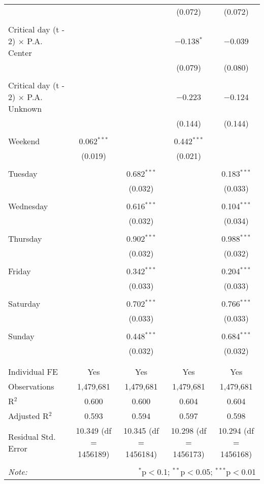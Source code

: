 \documentclass[
]{article}
\begin{document}
\begin{table}[!htbp]
{\begin{tabular}{@{\extracolsep{5pt}}lcccc}
  &  &  & (0.072) & (0.072) \\ 
  & & & & \\ 
 Critical day (t - 2) $\times$ P.A. Center &  &  & $-$0.138$^{*}$ & $-$0.039 \\ 
  &  &  & (0.079) & (0.080) \\ 
  & & & & \\ 
 Critical day (t - 2) $\times$ P.A. Unknown &  &  & $-$0.223 & $-$0.124 \\ 
  &  &  & (0.144) & (0.144) \\ 
  & & & & \\ 
 Weekend & 0.062$^{***}$ &  & 0.442$^{***}$ &  \\ 
  & (0.019) &  & (0.021) &  \\ 
  & & & & \\ 
 Tuesday &  & 0.682$^{***}$ &  & 0.183$^{***}$ \\ 
  &  & (0.032) &  & (0.033) \\ 
  & & & & \\ 
 Wednesday &  & 0.616$^{***}$ &  & 0.104$^{***}$ \\ 
  &  & (0.032) &  & (0.034) \\ 
  & & & & \\ 
 Thursday &  & 0.902$^{***}$ &  & 0.988$^{***}$ \\ 
  &  & (0.032) &  & (0.032) \\ 
  & & & & \\ 
 Friday &  & 0.342$^{***}$ &  & 0.204$^{***}$ \\ 
  &  & (0.033) &  & (0.033) \\ 
  & & & & \\ 
 Saturday &  & 0.702$^{***}$ &  & 0.766$^{***}$ \\ 
  &  & (0.033) &  & (0.033) \\ 
  & & & & \\ 
 Sunday &  & 0.448$^{***}$ &  & 0.684$^{***}$ \\ 
  &  & (0.032) &  & (0.032) \\ 
  & & & & \\ 
\hline \\[-1.8ex] 
Individual FE & Yes & Yes & Yes & Yes \\ 
Observations & 1,479,681 & 1,479,681 & 1,479,681 & 1,479,681 \\ 
R$^{2}$ & 0.600 & 0.600 & 0.604 & 0.604 \\ 
Adjusted R$^{2}$ & 0.593 & 0.594 & 0.597 & 0.598 \\ 
Residual Std. Error & 10.349 (df = 1456189) & 10.345 (df = 1456184) & 10.298 (df = 1456173) & 10.294 (df = 1456168) \\ 
\hline 
\hline \\[-1.8ex] 
\textit{Note:}  & \multicolumn{4}{r}{$^{*}$p$<$0.1; $^{**}$p$<$0.05; $^{***}$p$<$0.01} \\ 
\end{tabular}
} 
\end{table} 
\newpage
\end{document}
